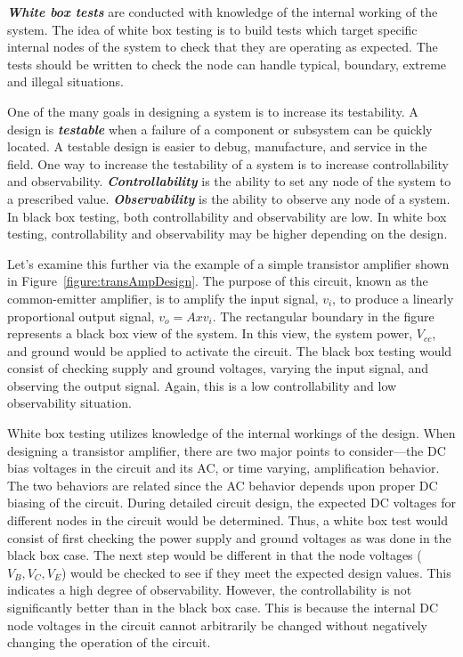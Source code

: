\emph{\textbf{White box tests}} are conducted with knowledge of the
internal working of the system. The idea of white box testing is to
build tests which target specific internal nodes of the system to check
that they are operating as expected. The tests should be written to
check the node can handle typical, boundary, extreme and illegal
situations.

One of the many goals in designing a system is to increase its
testability. A design is \emph{\textbf{testable}} when a failure of a
component or subsystem can be quickly located. A testable design is
easier to debug, manufacture, and service in the field. One way to
increase the testability of a system is to increase controllability and
observability. \emph{\textbf{Controllability}} is the ability to set any
node of the system to a prescribed value. \textbf{\emph{Observability}}
is the ability to observe any node of a system. In black box testing,
both controllability and observability are low. In white box testing,
controllability and observability may be higher depending on the design.

Let's examine this further via the example of a simple transistor
amplifier shown in Figure~\ref{figure:transAmpDesign}. 
The purpose of this circuit, known as the
common-emitter amplifier, is to amplify the input signal,
$v_i$, to produce a linearly
proportional output signal, $v_o = A x v_i$. The
rectangular boundary in the figure represents a black box view of the
system. In this view, the system power,
$V_{cc}$, and ground would be applied to
activate the circuit. The black box testing would consist of checking
supply and ground voltages, varying the input signal, and observing the
output signal. Again, this is a low controllability and low
observability situation.

White box testing utilizes knowledge of the internal workings of the
design. When designing a transistor amplifier, there are two major
points to consider---the DC bias voltages in the circuit and its AC, or
time varying, amplification behavior. The two behaviors are related
since the AC behavior depends upon proper DC biasing of the circuit.
During detailed circuit design, the expected DC voltages for different
nodes in the circuit would be determined. Thus, a white box test would
consist of first checking the power supply and ground voltages as was
done in the black box case. The next step would be different in that the
node voltages ($V_B, V_C, V_E$) would be checked
to see if they meet the expected design values. This indicates a high
degree of observability. However, the controllability is not
significantly better than in the black box case. This is because the
internal DC node voltages in the circuit cannot arbitrarily be changed
without negatively changing the operation of the circuit.

